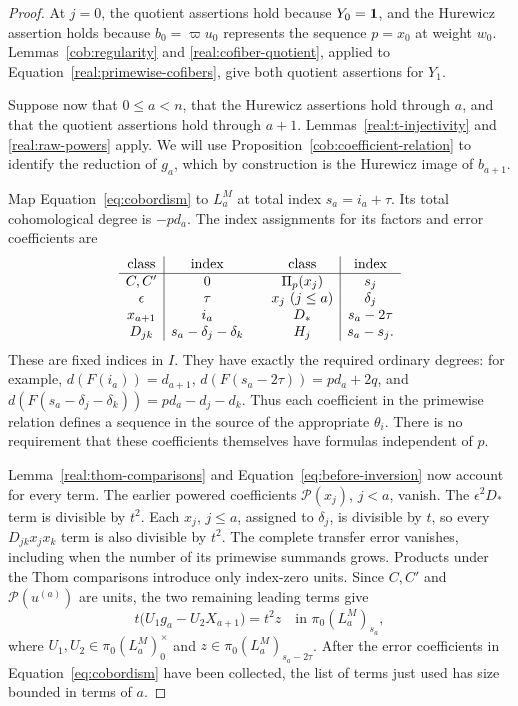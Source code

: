 \begin{proof}
At \(j=0\), the quotient assertions hold because \(Y_0=\mathbf 1\),
and the Hurewicz assertion holds because
\(b_0=\varpi u_0\) represents the sequence \(p=x_0\) at
weight \(w_0\).  Lemmas~\ref{cob:regularity} and
\ref{real:cofiber-quotient}, applied to
Equation~\eqref{real:primewise-cofibers}, give both quotient
assertions for \(Y_1\).

Suppose now that \(0\leq a<n\), that the Hurewicz assertions
hold through \(a\), and that the quotient assertions hold
through \(a+1\).  Lemmas~\ref{real:t-injectivity} and
\ref{real:raw-powers} apply.  We will use
Proposition~\ref{cob:coefficient-relation} to identify the reduction
of \(g_a\), which by construction is the Hurewicz image of
\(b_{a+1}\).

Map Equation~\eqref{eq:cobordism} to \(L_a^M\) at total
index \(s_a=i_a+\tau\).  Its total cohomological degree is
\(-p d_a\).  The index assignments for its factors and error
coefficients are
\[
\begin{array}{c|c@{\qquad}c|c}
 \text{class}&\text{index}&\text{class}&\text{index}\\ \hline
 C,C'&0&\Pi_p(x_j)&s_j\\
 \epsilon&\tau&x_j\ (j\leq a)&\delta_j\\
 x_{a+1}&i_a&D_*&s_a-2\tau\\
 D_{jk}&s_a-\delta_j-\delta_k&H_j&s_a-s_j.
\end{array}
\]
These are fixed indices in \(I\).  They have exactly the required
ordinary degrees: for example,
\(d(F(i_a))=d_{a+1}\),
\(d(F(s_a-2\tau))=p d_a+2q\), and
\(d(F(s_a-\delta_j-\delta_k))=p d_a-d_j-d_k\).
Thus each coefficient in the primewise relation defines a sequence
in the source of the appropriate \(\theta_i\).  There is no
requirement that these coefficients themselves have formulas
independent of \(p\).

Lemma~\ref{real:thom-comparisons} and
Equation~\eqref{eq:before-inversion} now account for every term.
The earlier powered coefficients \(\mathcal P(x_j)\),
\(j<a\), vanish.  The \(\epsilon^2D_*\) term is divisible
by \(t^2\).  Each \(x_j\), \(j\leq a\), assigned to
\(\delta_j\), is divisible by \(t\), so every
\(D_{jk}x_jx_k\) term is also divisible by \(t^2\).
The complete transfer error vanishes, including when the number of
its primewise summands grows.  Products under the Thom comparisons
introduce only index-zero units.  Since \(C,C'\) and
\(\mathcal P(u^{(a)})\) are units, the two remaining leading
terms give
\begin{equation}
 t\bigl(U_1g_a-U_2X_{a+1}\bigr)=t^2z
 \quad\text{in }\pi_0(L_a^M)_{s_a},
 \label{real:cancel-equation}
\end{equation}
where \(U_1,U_2\in\pi_0(L_a^M)_0^\times\) and
\(z\in\pi_0(L_a^M)_{s_a-2\tau}\).  After the error
coefficients in Equation~\eqref{eq:cobordism} have been collected,
the list of terms just used has size bounded in terms of \(a\).


\end{proof}
